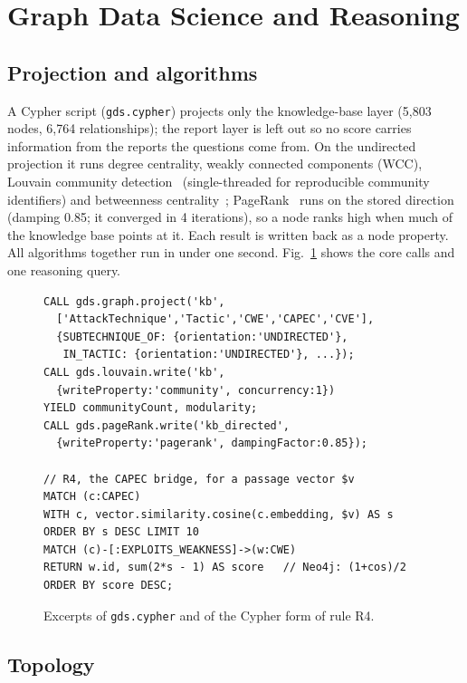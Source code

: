 \documentclass[conference]{IEEEtran}
\begin{document}
\section{Graph Data Science and Reasoning}\label{sec:gds}

\subsection{Projection and algorithms}

A Cypher script (\texttt{gds.cypher}) projects only the knowledge-base layer (5,803 nodes, 6,764 relationships); the report layer is left out so no score carries information from the reports the questions come from. On the undirected projection it runs degree centrality, weakly connected components (WCC), Louvain community detection~\cite{blondel2008louvain} (single-threaded for reproducible community identifiers) and betweenness centrality~\cite{brandes2001}; PageRank~\cite{page1999pagerank} runs on the stored direction (damping 0.85; it converged in 4 iterations), so a node ranks high when much of the knowledge base points at it. Each result is written back as a node property. All algorithms together run in under one second. Fig.~\ref{fig:cypher} shows the core calls and one reasoning query.

\begin{figure}[t]
\scriptsize
\begin{verbatim}
CALL gds.graph.project('kb',
  ['AttackTechnique','Tactic','CWE','CAPEC','CVE'],
  {SUBTECHNIQUE_OF: {orientation:'UNDIRECTED'},
   IN_TACTIC: {orientation:'UNDIRECTED'}, ...});
CALL gds.louvain.write('kb',
  {writeProperty:'community', concurrency:1})
YIELD communityCount, modularity;
CALL gds.pageRank.write('kb_directed',
  {writeProperty:'pagerank', dampingFactor:0.85});

// R4, the CAPEC bridge, for a passage vector $v
MATCH (c:CAPEC)
WITH c, vector.similarity.cosine(c.embedding, $v) AS s
ORDER BY s DESC LIMIT 10
MATCH (c)-[:EXPLOITS_WEAKNESS]->(w:CWE)
RETURN w.id, sum(2*s - 1) AS score   // Neo4j: (1+cos)/2
ORDER BY score DESC;
\end{verbatim}
\caption{Excerpts of \texttt{gds.cypher} and of the Cypher form of rule R4.}
\label{fig:cypher}
\end{figure}

\subsection{Topology}
\end{document}
